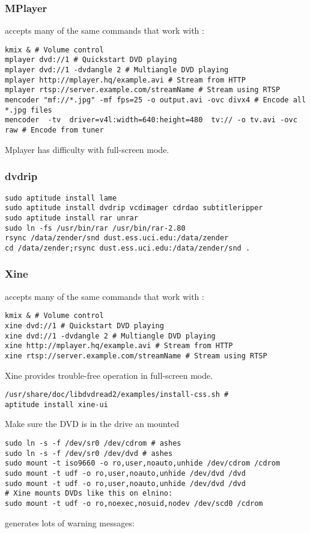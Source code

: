 \documentclass[12pt,twoside]{article}
\begin{document}
\subsubsection{MPlayer}\label{sxn:mplayer}
 accepts many of the same commands that work with
: 
\begin{verbatim}
kmix & # Volume control
mplayer dvd://1 # Quickstart DVD playing
mplayer dvd://1 -dvdangle 2 # Multiangle DVD playing
mplayer http://mplayer.hq/example.avi # Stream from HTTP
mplayer rtsp://server.example.com/streamName # Stream using RTSP
mencoder "mf://*.jpg" -mf fps=25 -o output.avi -ovc divx4 # Encode all *.jpg files
mencoder  -tv  driver=v4l:width=640:height=480  tv:// -o tv.avi -ovc raw # Encode from tuner
\end{verbatim}
Mplayer has difficulty with full-screen mode.

\subsubsection{dvdrip}\label{sxn:dvdrip}
\begin{verbatim}
sudo aptitude install lame
sudo aptitude install dvdrip vcdimager cdrdao subtitleripper
sudo aptitude install rar unrar
sudo ln -fs /usr/bin/rar /usr/bin/rar-2.80
rsync /data/zender/snd dust.ess.uci.edu:/data/zender
cd /data/zender;rsync dust.ess.uci.edu:/data/zender/snd .
\end{verbatim}

\subsubsection{Xine}\label{sxn:xine}
 accepts many of the same commands that work with
: 
\begin{verbatim}
kmix & # Volume control
xine dvd://1 # Quickstart DVD playing
xine dvd://1 -dvdangle 2 # Multiangle DVD playing
xine http://mplayer.hq/example.avi # Stream from HTTP
xine rtsp://server.example.com/streamName # Stream using RTSP
\end{verbatim}
Xine provides trouble-free operation in full-screen mode.

\begin{verbatim}
/usr/share/doc/libdvdread2/examples/install-css.sh # 
aptitude install xine-ui
\end{verbatim}
Make sure the DVD is in the drive an mounted
\begin{verbatim}
sudo ln -s -f /dev/sr0 /dev/cdrom # ashes
sudo ln -s -f /dev/sr0 /dev/dvd # ashes
sudo mount -t iso9660 -o ro,user,noauto,unhide /dev/cdrom /cdrom
sudo mount -t udf -o ro,user,noauto,unhide /dev/dvd /dvd 
sudo mount -t udf -o ro,user,noauto,unhide /dev/dvd /dvd 
# Xine mounts DVDs like this on elnino:
sudo mount -t udf -o ro,noexec,nosuid,nodev /dev/scd0 /cdrom
\end{verbatim}
 generates lots of warning messages: 
\end{document}
